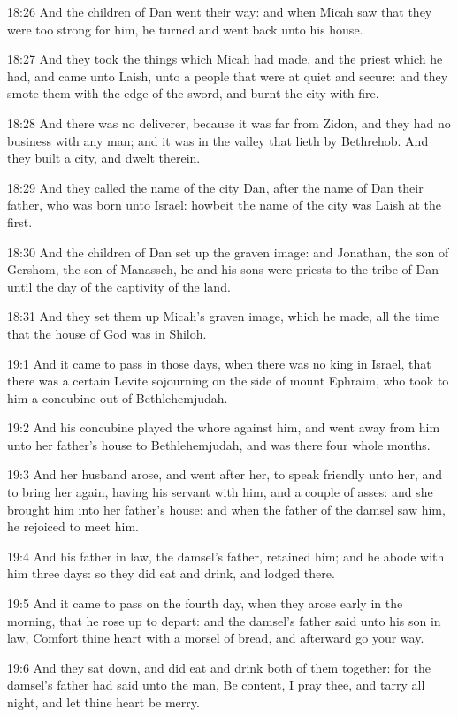 18:26 And the children of Dan went their way: and when Micah saw that they were too strong for him, he turned and went back unto his house.

18:27 And they took the things which Micah had made, and the priest which he had, and came unto Laish, unto a people that were at quiet and secure: and they smote them with the edge of the sword, and burnt the city with fire.

18:28 And there was no deliverer, because it was far from Zidon, and they had no business with any man; and it was in the valley that lieth by Bethrehob. And they built a city, and dwelt therein.

18:29 And they called the name of the city Dan, after the name of Dan their father, who was born unto Israel: howbeit the name of the city was Laish at the first.

18:30 And the children of Dan set up the graven image: and Jonathan, the son of Gershom, the son of Manasseh, he and his sons were priests to the tribe of Dan until the day of the captivity of the land.

18:31 And they set them up Micah's graven image, which he made, all the time that the house of God was in Shiloh.

19:1 And it came to pass in those days, when there was no king in Israel, that there was a certain Levite sojourning on the side of mount Ephraim, who took to him a concubine out of Bethlehemjudah.

19:2 And his concubine played the whore against him, and went away from him unto her father's house to Bethlehemjudah, and was there four whole months.

19:3 And her husband arose, and went after her, to speak friendly unto her, and to bring her again, having his servant with him, and a couple of asses: and she brought him into her father's house: and when the father of the damsel saw him, he rejoiced to meet him.

19:4 And his father in law, the damsel's father, retained him; and he abode with him three days: so they did eat and drink, and lodged there.

19:5 And it came to pass on the fourth day, when they arose early in the morning, that he rose up to depart: and the damsel's father said unto his son in law, Comfort thine heart with a morsel of bread, and afterward go your way.

19:6 And they sat down, and did eat and drink both of them together: for the damsel's father had said unto the man, Be content, I pray thee, and tarry all night, and let thine heart be merry.

